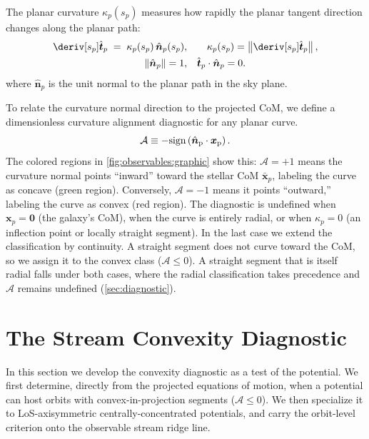 \documentclass[linenumbers,twocolumn]{aastex701}
\renewcommand{\mbf}[1]{\boldsymbol{#1}}
\newcommand{\xvec}{\mbf{x}}  %
\newcommand{\that}{\hat{\mbf{t}}}  %
\newcommand{\nhat}{\hat{\mbf{n}}}  %
\newcommand{\xcom}{\proj{\bar{\xvec}}}  %
\newcommand{\sarc}{s}  %
\newcommand{\curvature}{\kappa}  %
\newcommand{\proj}[1]{{#1}_{p}}  %
\newcommand{\xsky}{\proj{\xvec}}  %
\newcommand{\tphat}{\proj{\that}}  %
\newcommand{\nphat}{\proj{\nhat}}  %
\newcommand{\ssky}{\proj{\sarc}} %
\newcommand{\curvaturesky}{\proj{\curvature}}  %
\begin{document}
        The planar curvature $\curvaturesky(\ssky)$ measures how rapidly the planar tangent direction changes along the planar path: %
        \begin{align} \label{eq:theory:path:curvature_normal_2d}
            \deriv[\ssky]{\tphat} \;=\; \curvaturesky(\ssky)\,\nphat(\ssky),
            &\qquad
            \curvaturesky(\ssky) = \left\| \deriv[\ssky]{\tphat} \right\|,
            \\
            \|\nphat\| = 1,
            &\quad
            \tphat \cdot \nphat = 0 .
        \end{align}
        where $\nphat$ is the unit normal to the planar path in the sky plane.

        To relate the curvature normal direction to the projected \gls{CoM}, we define a dimensionless curvature alignment diagnostic for any planar curve. %
        \begin{equation}\label{eq:theory:path:alignment_def}
            \mathcal{A} \equiv -\rm{sign}\left(\nphat\cdot \xsky\right). %
        \end{equation}
        The colored regions in \autoref{fig:observables:graphic} show this: $\mathcal{A}=+1$ means the curvature normal points ``inward'' toward the stellar \gls{CoM} $\xcom$, labeling the curve as concave (green region). %
        Conversely, $\mathcal{A}=-1$ means it points ``outward,'' labeling the curve as convex (red region). %
        The diagnostic is undefined when $\xsky=\mbf{0}$ (the galaxy's \gls{CoM}), when the curve is entirely radial, or when $\curvaturesky=0$ (an inflection point or locally straight segment). %
        In the last case we extend the classification by continuity. %
        A straight segment does not curve toward the \gls{CoM}, so we assign it to the convex class ($\mathcal{A} \leq 0$). %
        A straight segment that is itself radial falls under both cases, where the radial classification takes precedence and $\mathcal{A}$ remains undefined (\autoref{sec:diagnostic}). %



\section{The Stream Convexity Diagnostic}\label{sec:diagnostic}

    In this section we develop the convexity diagnostic as a test of the potential. %
    We first determine, directly from the projected equations of motion, when a potential can host orbits with convex-in-projection segments ($\mathcal{A} \leq 0$). %
    We then specialize it to \gls{LoS}-axisymmetric centrally-concentrated potentials, and carry the orbit-level criterion onto the observable stream ridge line. %
\end{document}
